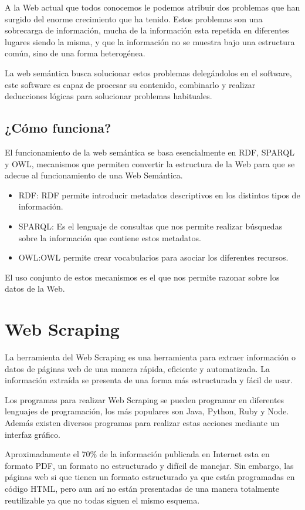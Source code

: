 A la Web actual que todos conocemos le podemos atribuir dos problemas que han surgido del enorme crecimiento que ha tenido. Estos problemas son una sobrecarga de información, mucha de la información esta repetida en diferentes lugares siendo la misma, y que la información no se muestra bajo una estructura común, sino de una forma heterogénea.

La web semántica busca solucionar estos problemas delegándolos en el software, este software es capaz de procesar su contenido, combinarlo y realizar deducciones lógicas para solucionar problemas habituales.

\subsection{¿Cómo funciona?}

El funcionamiento de la web semántica se basa esencialmente en RDF, SPARQL y OWL, mecanismos que permiten convertir la estructura de la Web para que se adecue al funcionamiento de una Web Semántica.
\begin{itemize}
	\item{RDF}: RDF permite introducir metadatos descriptivos en los distintos tipos de información.
	\item{SPARQL}: Es el lenguaje de consultas que nos permite realizar búsquedas sobre la información que contiene estos metadatos.
	\item{OWL}:OWL permite crear vocabularios para asociar los diferentes recursos.
\end{itemize}

El uso conjunto de estos mecanismos es el que nos permite razonar sobre los datos de la Web.

\section{Web Scraping}

La herramienta del Web Scraping es una herramienta para extraer información o datos de páginas web de una manera rápida, eficiente y automatizada. La información extraída se presenta de una forma más estructurada y fácil de usar.\cite{webScraping}

Los programas para realizar Web Scraping se pueden programar en diferentes lenguajes de programación, los más populares son Java, Python, Ruby y Node. Además existen diversos programas para realizar estas acciones mediante un interfaz gráfico.

Aproximadamente el 70\% de la información publicada en Internet esta en formato PDF, un formato no estructurado y difícil de manejar. Sin embargo, las páginas web si que tienen un formato estructurado ya que están programadas en código HTML, pero aun así no están presentadas de una manera totalmente reutilizable ya que no todas siguen el mismo esquema.

